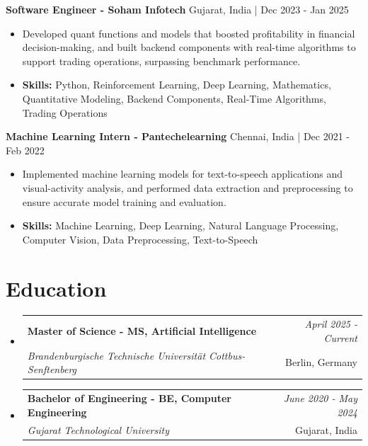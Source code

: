 \documentclass[a4paper,11pt]{article}
\makeatletter
\newcommand{\resumeSubheading}[4]{
\vspace{0.5mm}\item
    \begin{tabular*}{\linewidth}[t]{l@{\extracolsep{\fill}}r}
        \textbf{#1} & \textit{\footnotesize{#4}} \\
        \textit{\footnotesize{#3}} &  \footnotesize{#2}\\
    \end{tabular*}
    \vspace{-2.4mm}
}
\makeatother
\begin{document}
\vspace{1mm}
  \textbf{Software Engineer - Soham Infotech} \hfill Gujarat, India | Dec 2023 - Jan 2025
\vspace{-1.5mm} %
\begin{itemize}
  \item Developed quant functions and models that boosted profitability in financial decision-making, and built backend components with real-time algorithms to support trading operations, surpassing benchmark performance.

\vspace{-2mm}
  \item \textbf{Skills:} Python, Reinforcement Learning, Deep Learning, Mathematics, Quantitative Modeling, Backend Components, Real-Time Algorithms, Trading Operations
\end{itemize}

\vspace{1mm}
  \textbf{Machine Learning Intern - Pantechelearning} \hfill Chennai, India | Dec 2021 - Feb 2022
\vspace{-1.5mm} %
\begin{itemize}
  \item Implemented machine learning models for text-to-speech applications and visual-activity analysis, and performed data extraction and preprocessing to ensure accurate model training and evaluation.
\vspace{-2mm}
  \item \textbf{Skills:} Machine Learning, Deep Learning, Natural Language Processing, Computer Vision, Data Preprocessing, Text-to-Speech
\end{itemize}\section{\textbf{Education}}
\vspace{-0.4mm}

\begin{itemize}[leftmargin=0.15in, label={}]
\resumeSubheading
{Master of Science - MS, Artificial Intelligence }{Berlin, Germany}
{Brandenburgische Technische Universität Cottbus-Senftenberg  }{April 2025 - Current}

\vspace{1.0mm} %
\resumeSubheading
{Bachelor of Engineering - BE, Computer Engineering  }{Gujarat, India}
{Gujarat Technological University }{June 2020 - May 2024}

\end{itemize}
\end{document}
